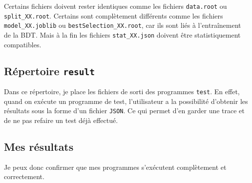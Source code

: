 Certains fichiers doivent rester identiques comme les fichiers \verb|data.root| ou \verb|split_XX.root|. Certains sont complètement différents comme les fichiers \verb|model_XX.joblib| ou \verb|bestSelection_XX.root|, car ils sont liés à l'entraînement de la BDT. Mais à la fin les fichiers \verb|stat_XX.json| doivent être statistiquement compatibles.

\subsection{Répertoire \texttt{result}}

Dans ce répertoire, je place les fichiers de sorti des programmes \texttt{test}. 
En effet, quand on exécute un programme de test, l'utilisateur a la possibilité d'obtenir les résultats sous la forme d'un fichier \texttt{JSON}. 
Ce qui permet d'en garder une trace et de ne pas refaire un test déjà effectué.\\

\subsection{Mes résultats}

Je peux donc confirmer que mes programmes s'exécutent complètement et correctement.